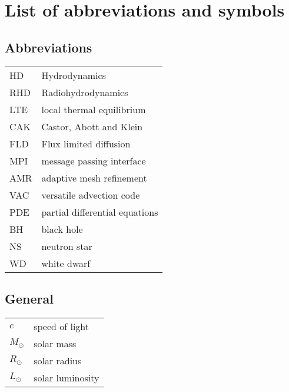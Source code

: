 \chapter*{List of abbreviations and symbols}
\begin{multicols}{2}
\section*{Abbreviations}
\begin{tabular}{ll}
HD     & Hydrodynamics             \\
RHD    & Radiohydrodynamics        \\
LTE    & local thermal equilibrium \\
CAK    & Castor, Abott and Klein   \\
FLD    & Flux limited diffusion    \\
MPI    & message passing interface \\
AMR    & adaptive mesh refinement  \\
VAC    & versatile advection code  \\
PDE    & partial differential equations \\
BH     & black hole \\
NS     & neutron star \\
WD 	   & white dwarf \\
\end{tabular}

\section*{General}
\begin{tabular}{ll}
$c$               & speed of light \\
$M_\odot$         & solar mass  \\
$R_\odot$         & solar radius\\
$L_\odot$         & solar luminosity \\

\end{tabular}


\end{multicols}
